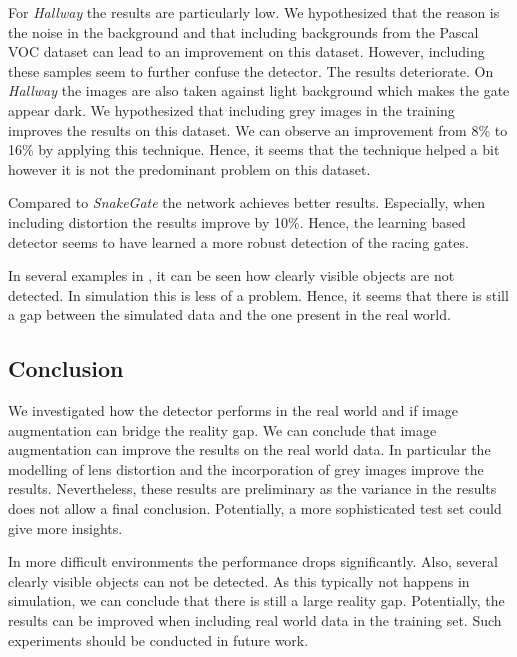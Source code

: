 For \textit{Hallway} the results are particularly low. We hypothesized that the reason is the noise in the background and that including backgrounds from the Pascal VOC dataset can lead to an improvement on this dataset. However, including these samples seem to further confuse the detector. The results deteriorate. On \textit{Hallway} the images are also taken against light background which makes the gate appear dark. We hypothesized that including grey images in the training improves the results on this dataset. We can observe an improvement from 8\% to 16\% by applying this technique. Hence, it seems that the technique helped a bit however it is not the predominant problem on this dataset.

Compared to \textit{SnakeGate} the network achieves better results. Especially, when including distortion the results improve by 10\%. Hence, the learning based detector seems to have learned a more robust detection of the racing gates.

In several examples in , it can be seen how clearly visible objects are not detected. In simulation this is less of a problem. Hence, it seems that there is still a gap between the simulated data and the one present in the real world.

\subsection{Conclusion}

We investigated how the detector performs in the real world and if image augmentation can bridge the reality gap. We can conclude that image augmentation can improve the results on the real world data. In particular the modelling of lens distortion and the incorporation of grey images improve the results. Nevertheless, these results are preliminary as the variance in the results does not allow a final conclusion. Potentially, a more sophisticated test set could give more insights.


In more difficult environments the performance drops significantly. Also, several clearly visible objects can not be detected. As this typically not happens in simulation, we can conclude that there is still a large reality gap. Potentially, the results can be improved when including real world data in the training set. Such experiments should be conducted in future work.

